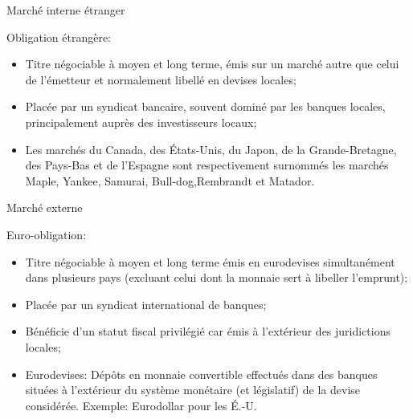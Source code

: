 \documentclass{beamer}
\begin{document}
\begin{frame}{Marché interne étranger}
\begin{block}{Obligation étrangère:}
\begin{itemize}
\item Titre négociable à moyen et long terme, émis sur un marché autre que celui de l’émetteur et normalement libellé en devises locales;
\item Placée par un syndicat bancaire, souvent dominé par les banques locales, principalement auprès des investisseurs locaux;
\item Les marchés du Canada, des États-Unis, du Japon, de la Grande-Bretagne, des Pays-Bas et de l’Espagne sont respectivement surnommés les marchés Maple, Yankee, Samurai, Bull-dog,Rembrandt et Matador.
\end{itemize}
\end{block}
\end{frame}

\begin{frame}{Marché externe}
\begin{block}{Euro-obligation:}
\begin{itemize}
\item Titre négociable à moyen et long terme émis en eurodevises simultanément dans plusieurs pays (excluant celui dont la monnaie sert à libeller l’emprunt);
\item Placée par un syndicat international de banques;
\item Bénéficie d’un statut fiscal privilégié car émis à l’extérieur des juridictions locales;
\item Eurodevises: Dépôts en monnaie convertible effectués dans des banques situées à l’extérieur du système monétaire (et législatif) de la devise considérée. Exemple: Eurodollar pour les É.-U.
\end{itemize}
\end{block}
\end{frame}
\end{document}
